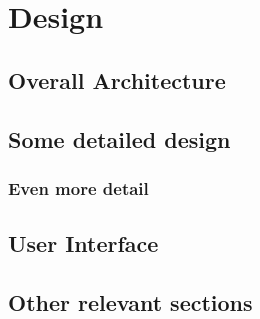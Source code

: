 \chapter{Design}



\section{Overall Architecture}


\section{Some detailed design}

\subsection{Even more detail}

\section{User Interface}

\section{Other relevant sections}